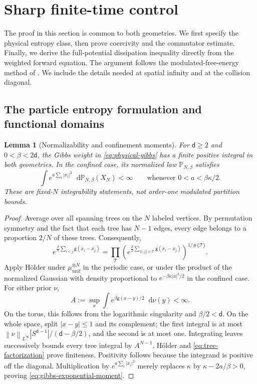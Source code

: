 \documentclass[11pt,reqno]{amsart}
\numberwithin{equation}{section}
\newtheorem{lemma}[lemma]{Lemma}
\theoremstyle{definition}
\theoremstyle{remark}
\newcommand{\g}{\mathsf g}
\renewcommand{\d}{\mathsf d}
\newcommand{\Pb}{\mathbb P}
\newcommand{\muunif}{\mu_{\mathrm{unif}}}
\newcommand{\dd}{\mathop{}\!\mathrm d}
\newcommand{\norm}[1]{\left\lVert#1\right\rVert}
\begin{document}
\section{Sharp finite-time control}\label{sec:finite}

The proof in this section is common to both geometries. We first specify the physical entropy class, then prove coercivity and the commutator estimate. Finally, we derive the full-potential dissipation inequality directly from the weighted forward equation. The argument follows the modulated-free-energy method of \cite[Proposition~2.3 and (2.25)]{BJW}. We include the details needed at spatial infinity and at the collision diagonal.

\subsection{The particle entropy formulation and functional domains}
\begin{lemma}[Normalizability and confinement moments]\label{lem:normalization}
For $\d\geq2$ and $0<\beta<2\d$, the Gibbs weight in \eqref{eq:physical-gibbs} has a finite positive integral in both geometries. In the confined case, its normalized law $\Pb_{N,\beta}$ satisfies
\begin{equation}\label{eq:gibbs-exponential-moment}
 \int e^{a\sum_i|x_i|^2}\dd\Pb_{N,\beta}(X_N)<\infty
 \qquad\text{whenever }0<a<\beta\kappa/2.
\end{equation}
These are fixed-$N$ integrability statements, not order-one modulated partition bounds.
\end{lemma}
\begin{proof}
Average over all spanning trees on the $N$ labeled vertices. By permutation symmetry and the fact that each tree has $N-1$ edges, every edge belongs to a proportion $2/N$ of these trees. Consequently,
\begin{equation}\label{eq:tree-factorization}
 e^{\frac\beta N\sum_{i<j}\g(x_i-x_j)}
 =\prod_{\mathcal T}
 \left(e^{\frac\beta2\sum_{\{i,j\}\in\mathcal T}\g(x_i-x_j)}\right)^{1/\#\{\mathcal T\}}.
\end{equation}
Apply H\"older under $\muunif^{\otimes N}$ in the periodic case, or under the product of the normalized Gaussian with density proportional to $e^{-\beta\kappa|x|^2/2}$ in the confined case. For either prior $\nu$,
\begin{equation}\label{eq:tree-row}
 A:=\sup_x\int e^{\beta\g(x-y)/2}\dd\nu(y)<\infty.
\end{equation}
On the torus, this follows from the logarithmic singularity and $\beta/2<\d$. On the whole space, split $|x-y|\leq1$ and its complement; the first integral is at most $\norm{\nu}_{L^\infty}|S^{\d-1}|/(\d-\beta/2)$, and the second is at most one. Integrating leaves successively bounds every tree integral by $A^{N-1}$. H\"older and \eqref{eq:tree-factorization} prove finiteness. Positivity follows because the integrand is positive off the diagonal. Multiplication by $e^{a\sum_i|x_i|^2}$ merely replaces $\kappa$ by $\kappa-2a/\beta>0$, proving \eqref{eq:gibbs-exponential-moment}.
\end{proof}
\end{document}
